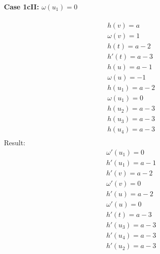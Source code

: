 \paragraph*{\textbf{Case 1cII}: $\omega(u_1) = 0$}
\[
\begin{split}
& h(v) = a \\
& \omega(v) = 1 \\
& h(t) = a - 2 \\
& h'(t) = a - 3 \\
& h(u) = a - 1 \\
& \omega(u) = -1 \\
& h(u_1) = a - 2 \\
& \omega(u_1) = 0 \\
& h(u_2) = a - 3 \\
& h(u_3) = a - 3 \\
& h(u_4) = a - 3 \\
\end{split}
\]
Result:
\[
\begin{split}
& \omega'(u_1) = 0 \\
& h'(u_1) = a - 1 \\
& h'(v) = a - 2 \\
& \omega'(v) = 0 \\
& h'(u) = a - 2 \\
& \omega'(u) = 0 \\
& h'(t) = a - 3 \\
& h'(u_3) = a - 3 \\
& h'(u_4) = a - 3 \\
& h'(u_2) = a - 3 \\
\end{split}
\]

